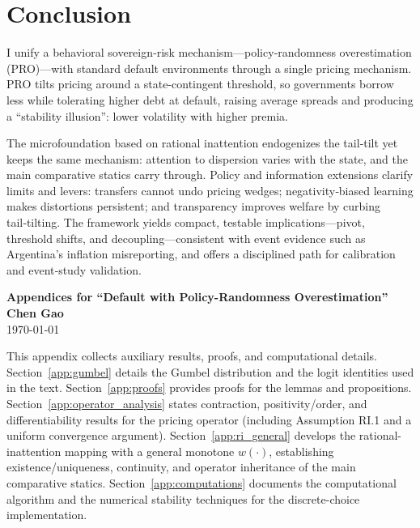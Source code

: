 \documentclass[12pt]{article}
\theoremstyle{plain}
\begin{document}
\section{Conclusion}

I unify a behavioral sovereign‑risk mechanism—policy‑randomness overestimation
(PRO)—with standard default environments through a single pricing mechanism.
PRO tilts pricing around a state‑contingent threshold, so governments borrow
less while tolerating higher debt at default, raising average spreads and
producing a “stability illusion”: lower volatility with higher premia.

The microfoundation based on rational inattention endogenizes the tail‑tilt yet
keeps the same mechanism: attention to dispersion varies with the state, and
the main comparative statics carry through. Policy and information extensions
clarify limits and levers: transfers cannot undo pricing wedges;
negativity‑biased learning makes distortions persistent; and transparency
improves welfare by curbing tail‑tilting. The framework yields compact,
testable implications—pivot, threshold shifts, and decoupling—consistent with
event evidence such as Argentina’s inflation misreporting, and offers a
disciplined path for calibration and event‑study validation.

\clearpage
\appendix

\setcounter{equation}{0}
\renewcommand{\theequation}{\thesection.\arabic{equation}}

\begin{center}
	\Large \textbf{Appendices for ``Default with Policy-Randomness Overestimation''}\\
	\vspace{0.5cm}
	\large \textbf{Chen Gao}
	\\
	\large \today
\end{center}

This appendix collects auxiliary results, proofs, and computational details.
Section~\ref{app:gumbel} details the Gumbel distribution and the logit
identities used in the text. Section~\ref{app:proofs} provides proofs for the
lemmas and propositions. Section~\ref{app:operator_analysis} states
contraction, positivity/order, and differentiability results for the pricing
operator (including Assumption RI.1 and a uniform convergence argument).
Section~\ref{app:ri_general} develops the rational-inattention mapping with a
general monotone $w(\cdot)$, establishing existence/uniqueness, continuity, and
operator inheritance of the main comparative statics.
Section~\ref{app:computations} documents the computational algorithm and the
numerical stability techniques for the discrete-choice implementation.
\end{document}
